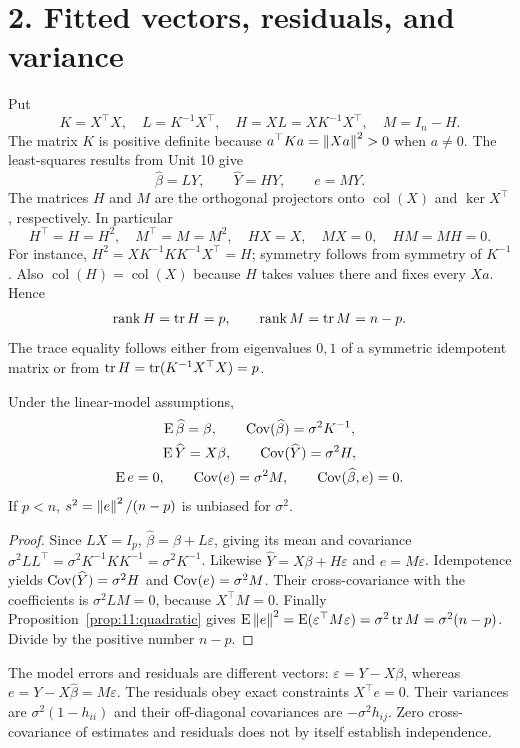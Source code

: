 \section*{2. Fitted vectors, residuals, and variance}
Put
\[
K=X^\top X,\quad L=K^{-1}X^\top,\quad
H=XL=XK^{-1}X^\top,\quad M=I_n-H.
\]
The matrix $K$ is positive definite because
$a^\top Ka=\left\lVert Xa\right\rVert^2>0$ when $a\ne0$.
The least-squares results from Unit 10 give
\[
\widehat\beta=LY,\qquad \widehat Y=HY,\qquad e=MY.
\]
The matrices $H$ and $M$ are the orthogonal projectors onto
$\operatorname{col}(X)$ and $\ker X^\top$, respectively. In particular
\[
H^\top=H=H^2,\quad M^\top=M=M^2,\quad
HX=X,\quad MX=0,\quad HM=MH=0.
\]
For instance, $H^2=XK^{-1}KK^{-1}X^\top=H$; symmetry follows from
symmetry of $K^{-1}$. Also $\operatorname{col}(H)=\operatorname{col}(X)$
because $H$ takes values there and fixes every $Xa$. Hence
\[
\operatorname{rank}H=\operatorname{tr} H=p,\qquad
\operatorname{rank}M=\operatorname{tr} M=n-p.
\]
The trace equality follows either from eigenvalues $0,1$ of a symmetric
idempotent matrix or from $\operatorname{tr} H=\operatorname{tr}(K^{-1}X^\top X)=p$.

\begin{theorem}\label{thm:11:moments}
Under the linear-model assumptions,
\[
\begin{gathered}
\operatorname{E}\widehat\beta=\beta,\qquad \operatorname{Cov}(\widehat\beta)=\sigma^2K^{-1},\\
\operatorname{E}\widehat Y=X\beta,\qquad \operatorname{Cov}(\widehat Y)=\sigma^2H,\\
\operatorname{E} e=0,\qquad \operatorname{Cov}(e)=\sigma^2M,\qquad
\operatorname{Cov}(\widehat\beta,e)=0.
\end{gathered}
\]
If $p<n$, $s^2=\left\lVert e\right\rVert^2/(n-p)$ is unbiased for $\sigma^2$.
\end{theorem}
\begin{proof}
Since $LX=I_p$, $\widehat\beta=\beta+L\varepsilon$, giving its mean and
covariance $\sigma^2LL^\top=\sigma^2K^{-1}KK^{-1}=\sigma^2K^{-1}$.
Likewise $\widehat Y=X\beta+H\varepsilon$ and $e=M\varepsilon$.
Idempotence yields $\operatorname{Cov}(\widehat Y)=\sigma^2H$ and
$\operatorname{Cov}(e)=\sigma^2M$. Their cross-covariance with the coefficients is
$\sigma^2LM=0$, because $X^\top M=0$.
Finally Proposition~\ref{prop:11:quadratic} gives
$\operatorname{E}\left\lVert e\right\rVert^2=\operatorname{E}(\varepsilon^\top M\varepsilon)=\sigma^2\operatorname{tr} M
=\sigma^2(n-p)$. Divide by the positive number $n-p$.
\end{proof}

The model errors and residuals are different vectors:
$\varepsilon=Y-X\beta$, whereas $e=Y-X\widehat\beta=M\varepsilon$.
The residuals obey exact constraints $X^\top e=0$. Their variances are
$\sigma^2(1-h_{ii})$ and their off-diagonal covariances are
$-\sigma^2h_{ij}$. Zero cross-covariance of estimates and residuals
does not by itself establish independence.

